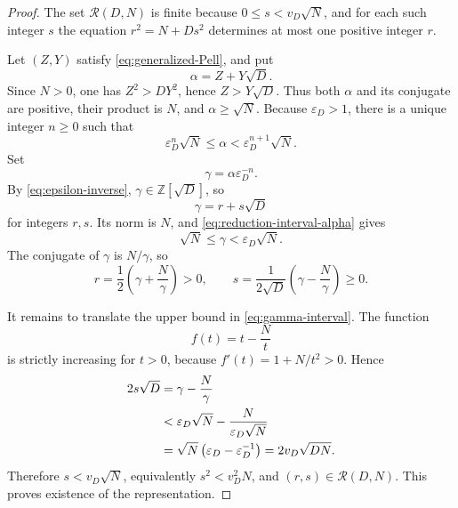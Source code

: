 \documentclass[11pt,a4paper]{amsart}
\theoremstyle{definition}
\newcommand{\Z}{\mathbb Z}
\newcommand{\eps}{\varepsilon}
\numberwithin{equation}{section}
\begin{document}
\begin{proof}
The set \(\mathcal R(D,N)\) is finite because
\(0\leq s<v_D\sqrt N\), and for each such integer \(s\) the equation
\(r^2=N+Ds^2\) determines at most one positive integer \(r\).

Let \((Z,Y)\) satisfy \eqref{eq:generalized-Pell}, and put
\begin{equation}
 \alpha=Z+Y\sqrt D.
\end{equation}
Since \(N>0\), one has \(Z^2>DY^2\), hence
\(Z>Y\sqrt D\).  Thus both \(\alpha\) and its conjugate are positive, their product
is \(N\), and \(\alpha\geq\sqrt N\).  Because \(\eps_D>1\), there is a unique
integer \(n\geq0\) such that
\begin{equation}
 \eps_D^n\sqrt N\leq\alpha<\eps_D^{n+1}\sqrt N.
 \label{eq:reduction-interval-alpha}
\end{equation}
Set
\begin{equation}
 \gamma=\alpha\eps_D^{-n}.
\end{equation}
By \eqref{eq:epsilon-inverse}, \(\gamma\in\Z[\sqrt D]\), so
\begin{equation}
 \gamma=r+s\sqrt D
 \label{eq:gamma-rs}
\end{equation}
for integers \(r,s\).  Its norm is \(N\), and
\eqref{eq:reduction-interval-alpha} gives
\begin{equation}
 \sqrt N\leq\gamma<\eps_D\sqrt N.
 \label{eq:gamma-interval}
\end{equation}
The conjugate of \(\gamma\) is \(N/\gamma\), so
\begin{equation}
 r=\frac12\left(\gamma+\frac N\gamma\right)>0,
 \qquad
 s=\frac1{2\sqrt D}\left(\gamma-\frac N\gamma\right)\geq0.
 \label{eq:r-s-signs}
\end{equation}

It remains to translate the upper bound in \eqref{eq:gamma-interval}.  The function
\begin{equation}
 f(t)=t-\frac Nt
\end{equation}
is strictly increasing for \(t>0\), because
\(f'(t)=1+N/t^2>0\).  Hence
\begin{align}
 2s\sqrt D
 &=\gamma-\frac N\gamma\notag\\
 &<\eps_D\sqrt N-\frac{N}{\eps_D\sqrt N}\notag\\
 &=\sqrt N\left(\eps_D-\eps_D^{-1}\right)
 =2v_D\sqrt{DN}.
 \label{eq:seed-bound-derived}
\end{align}
Therefore \(s<v_D\sqrt N\), equivalently \(s^2<v_D^2N\), and
\((r,s)\in\mathcal R(D,N)\).  This proves existence of the representation.


\end{proof}
\end{document}
